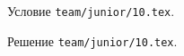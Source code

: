 \problem
Условие \texttt{team/junior/10.tex}.

\solution Решение \texttt{team/junior/10.tex}.
\endproblem
